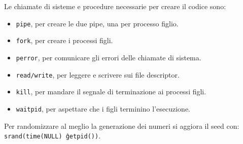 Le chiamate di sisteme e procedure necessarie per creare il codice sono:
\begin{itemize}
    \item \texttt{pipe}, per creare le due pipe, una per processo figlio.
    \item \texttt{fork}, per creare i processi figli.
    \item \texttt{perror}, per comunicare gli errori delle chiamate di sistema.
    \item \texttt{read/write}, per leggere e scrivere sui file descriptor.
    \item \texttt{kill}, per mandare il segnale di terminazione ai processi figli.
    \item \texttt{waitpid}, per aspettare che i figli terminino l'esecuzione.
\end{itemize}

Per randomizzare al meglio la generazione dei numeri si aggiora il seed con: \texttt{srand(time(NULL) \^ getpid())}.
